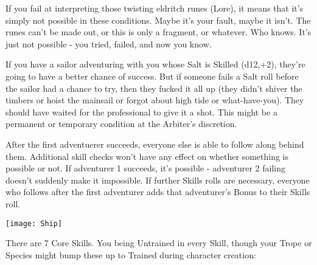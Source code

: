 {  If you fail at interpreting those twisting eldritch runes (Lore), it means that it's simply not possible in these conditions.  Maybe it's your fault, maybe it isn't.  The runes can't be made out, or this is only a fragment, or whatever.  Who knows.  It's just not possible - you tried, failed, and now you know.

  If you have a sailor adventuring with you whose Salt is Skilled (d12,+2), they're going to have a better chance of success.  But if someone fails a Salt roll before the sailor had a chance to try, then they fucked it all up (they didn't shiver the timbers or hoist the mainsail or forgot about high tide or what-have-you).  They should have waited for the professional to give it a shot.  This might be a permanent or temporary condition at the Arbiter's discretion.

  After the first adventuerer succeeds, everyone else is able to follow along behind them.  Additional skill checks won't have any effect on whether something is possible or not.  If adventurer 1 succeeds, it's possible - adventurer 2 failing doesn't suddenly make it impossible.  If further Skills rolls are necessary, everyone who follows after the first adventurer adds that adventurer's Bonus to their Skills roll.

    \begin{center}
  \texttt{[image: Ship]}
  \end{center}
 
  \cbreak


  There are 7 Core Skills.  You being Untrained in every Skill, though your Trope or Species might bump these up to Trained during character creation:





}
